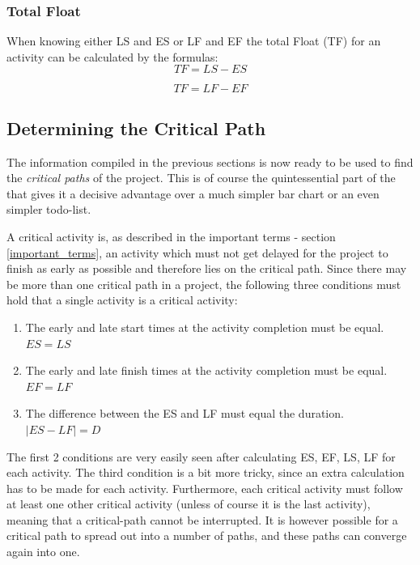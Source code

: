 \subsubsection{Total Float}
 
 When knowing either LS and ES  or LF and EF the total Float (TF) for an activity can be calculated by the formulas:
\begin{equation}
	TF = LS - ES
\end{equation}	

\begin{equation}
TF = LF - EF
\end{equation} 




\subsection{Determining the Critical Path} \label{determine_crit_path}
The information compiled in the previous sections is now ready to be used to find the \emph{critical
paths} of the project. This is of course the quintessential part of the \cpm{} that gives it a
decisive advantage over a much simpler bar chart or an even simpler todo-list.

A critical activity is, as described in the important terms - section \ref{important_terms}, an activity which must not get delayed for the project to finish as early as possible and therefore lies on the critical path. Since there may be more than one critical path in a project, the following three conditions must hold that a single activity is a critical activity:

\begin{enumerate}
	\item The early and late start times at the activity completion must be equal. $ ES = LS $
	\item The early and late finish times at the activity completion must be equal. $ EF = LF $
	\item The difference between the ES and LF must equal the duration. $ |ES - LF| = D $
\end{enumerate}

The first 2 conditions are very easily seen after calculating ES, EF, LS, LF for each activity. The third condition is a bit more tricky, since an extra calculation has to be made for each activity.
Furthermore, each critical activity must follow at least one other critical activity (unless of course it is the last activity), meaning that a critical-path cannot be interrupted. It is however possible for a critical path to spread out into a number of paths, and these paths can converge again into one.

